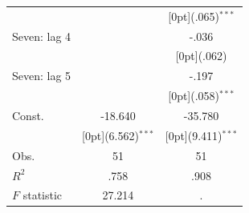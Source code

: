 \documentclass[12pt,a4paper,titlepage]{article}
\begin{document}
{\begin{tabular*}{\textwidth}{@{\extracolsep{\fill}}lcc}
&	&	\raisebox{.7ex}[0pt]{\scriptsize (.065)$^{***}$} \\
Seven: lag 4 &	&	-.036 \\
&	&	\raisebox{.7ex}[0pt]{\scriptsize (.062)} \\
Seven: lag 5 &	&	-.197 \\
&	&	\raisebox{.7ex}[0pt]{\scriptsize (.058)$^{***}$} \\
Const. &	-18.640 &	-35.780 \\
&	\raisebox{.7ex}[0pt]{\scriptsize (6.562)$^{***}$} &	\raisebox{.7ex}[0pt]{\scriptsize (9.411)$^{***}$} \\
Obs. &	51 &	51 \\
$ R^2$ &	.758 &	.908 \\
$ F$ statistic &	27.214 &	. \\
\hline\hline		
\end{tabular*}
\newpage

}
\end{document}
